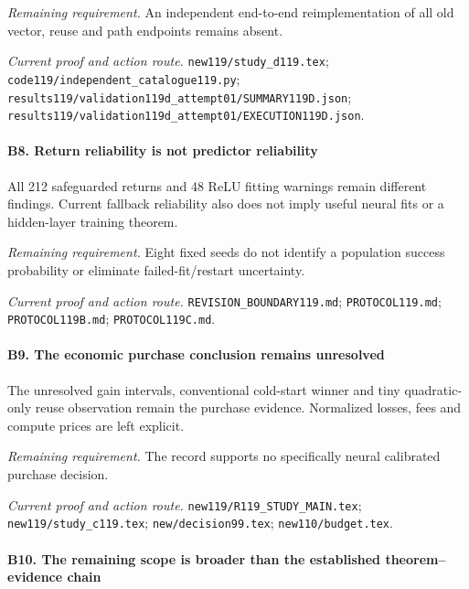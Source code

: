 \par\emph{Remaining requirement.} An independent end-to-end reimplementation of all old vector, reuse and path endpoints remains absent.

\par\emph{Current proof and action route.} \nolinkurl{new119/study_d119.tex}; \nolinkurl{code119/independent_catalogue119.py}; \nolinkurl{results119/validation119d_attempt01/SUMMARY119D.json}; \nolinkurl{results119/validation119d_attempt01/EXECUTION119D.json}.

\paragraph{B8. Return reliability is not predictor reliability}

All 212 safeguarded returns and 48 ReLU fitting warnings remain different findings. Current fallback reliability also does not imply useful neural fits or a hidden-layer training theorem.

\par\emph{Remaining requirement.} Eight fixed seeds do not identify a population success probability or eliminate failed-fit/\allowbreak{}restart uncertainty.

\par\emph{Current proof and action route.} \nolinkurl{REVISION_BOUNDARY119.md}; \nolinkurl{PROTOCOL119.md}; \nolinkurl{PROTOCOL119B.md}; \nolinkurl{PROTOCOL119C.md}.

\paragraph{B9. The economic purchase conclusion remains unresolved}

The unresolved gain intervals, conventional cold-start winner and tiny quadratic-only reuse observation remain the purchase evidence. Normalized losses, fees and compute prices are left explicit.

\par\emph{Remaining requirement.} The record supports no specifically neural calibrated purchase decision.

\par\emph{Current proof and action route.} \nolinkurl{new119/R119_STUDY_MAIN.tex}; \nolinkurl{new119/study_c119.tex}; \nolinkurl{new/decision99.tex}; \nolinkurl{new110/budget.tex}.

\paragraph{B10. The remaining scope is broader than the established theorem--evidence chain}

